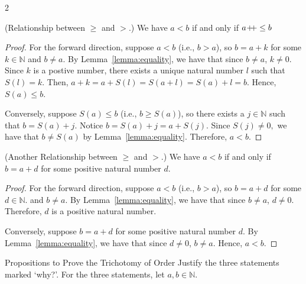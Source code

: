\begin{multicols}{2}
\begin{proposition}
    (Relationship between $\geq$ and $>$.)
    We have $a < b$ if and only if $a \! +\!\!\!+ \leq b$
\end{proposition}
\begin{proof}
    For the forward direction, suppose $a < b$ (i.e., $b > a$), so $b = a + k$ for some $k \in \mathbb{N}$ and $b \neq a.$
    By Lemma~\ref{lemma:equality}, we have that since $b \neq a$, $k \neq 0.$
    Since $k$ is a postive number, there exists a unique natural number $l$ such that $S(l) = k.$
    Then, $a + k = a + S(l) = S(a + l) = S(a) + l = b.$ Hence, $S(a) \leq b$.

    Conversely, suppose $S(a) \leq b$ (i.e., $b \geq S(a)$), so there exists a $j \in \mathbb{N}$ such that $b = S(a) + j.$
    Notice $b = S(a) + j = a + S(j).$ Since $S(j) \neq 0,$ we have that $b \neq S(a)$ by Lemma~\ref{lemma:equality}.
    Therefore, $a < b.$
\end{proof}

\begin{proposition}
    (Another Relationship between $\geq$ and $>$.)
    We have $a < b$ if and only if $b = a + d$ for some positive natural number $d$.
\end{proposition}
\begin{proof}
    For the forward direction, suppose $a < b$ (i.e., $b > a$), so $b = a + d$ for some $d \in \mathbb{N}.$ and $b \neq a.$
    By Lemma~\ref{lemma:equality}, we have that since $b \neq a$, $d \neq 0.$ 
    Therefore, $d$ is a positive natural number.

    Conversely, suppose $b = a + d$ for some positive natural number $d$.
    By Lemma~\ref{lemma:equality}, we have that since $d \neq 0$, $b \neq a.$ 
    Hence, $a < b.$

\end{proof}
\end{multicols}

\begin{problem}{Propositions to Prove the Trichotomy of Order}
    Justify the three statements marked `why?'. 
    For the three statements, let $a, b \in \mathbb{N}.$
\end{problem}

